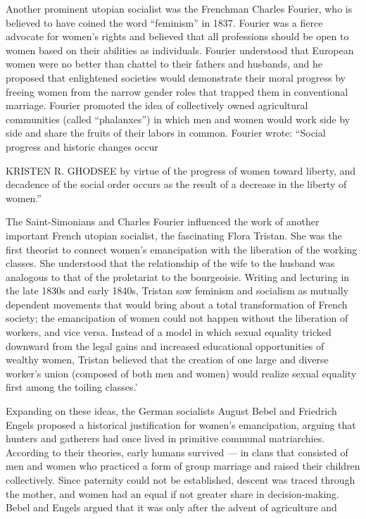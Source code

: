  \par 
Another prominent utopian socialist was the Frenchman Charles Fourier, who is believed to have coined the word “feminism” in 1837. Fourier was a fierce advocate for women’s rights and believed that all professions should be open to women based on their abilities as individuals. Fourier understood that European women were no better than chattel to their fathers and husbands, and he proposed that enlightened societies would demonstrate their moral progress by freeing women from the narrow gender roles that trapped them in conventional marriage. Fourier promoted the idea of collectively owned agricultural communities (called “phalanxes”) in which men and women would work side by side and share the fruits of their labors in common. Fourier wrote: “Social progress and historic changes occur
 \par 
KRISTEN R. GHODSEE by virtue of the progress of women toward liberty, and decadence of the social order occurs as the result of a decrease in the liberty of women.”
 \par 
The Saint-Simonians and Charles Fourier influenced the work of another important French utopian socialist, the fascinating Flora Tristan. She was the first theorist to connect women’s emancipation with the liberation of the working classes. She understood that the relationship of the wife to the husband was analogous to that of the proletariat to the bourgeoisie. Writing and lecturing in the late 1830s and early 1840s, Tristan saw feminism and socialism as mutually dependent movements that would bring about a total transformation of French society; the emancipation of women could not happen without the liberation of workers, and vice versa. Instead of a model in which sexual equality tricked downward from the legal gains and increased educational opportunities of wealthy women, Tristan believed that the creation of one large and diverse worker's union (composed of both men and women) would realize sexual equality first among the toiling classes.’
 \par 
Expanding on these ideas, the German socialists August Bebel and Friedrich Engels proposed a historical justification for women’s emancipation, arguing that hunters and gatherers had once lived in primitive communal matriarchies. According to their theories, early humans survived — in clans that consisted of men and women who practiced a form of group marriage and raised their children collectively. Since paternity could not be established, descent was traced through the mother, and women had an equal if not greater share in decision-making. Bebel and Engels argued that it was only after the advent of agriculture and
